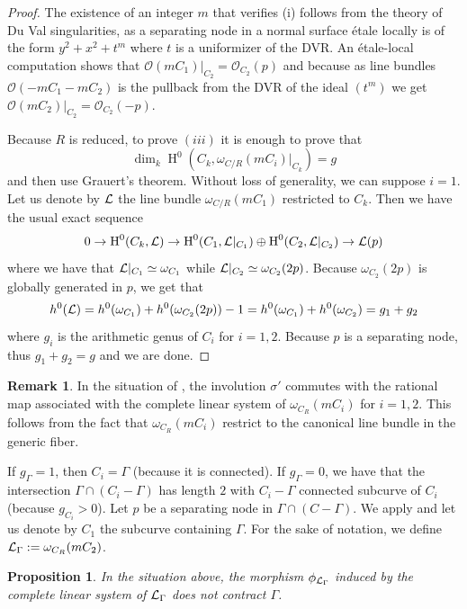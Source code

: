 \documentclass{alggeom}
\numberwithin{equation}{section}
\numberwithin{subsection}{section}
\newtheorem{proposition}[theorem]{Proposition}
\theoremstyle{definition}
\newtheorem{remark}[theorem]{Remark}
\theoremstyle{remark}
\newcommand\cO{\mathcal{O}} \newcommand\cP{\mathcal{P}}
\renewcommand\H{\operatorname{H}}
\begin{document}
\begin{proof}
	The existence of an integer $m$ that verifies (i) follows from the theory of Du Val singularities, as a separating node in a normal surface \'etale locally is of the form $y^2+x^2+t^m$ where $t$ is a uniformizer of the DVR. An \'etale-local computation shows that $\cO(mC_1)\vert_{C_2}=\cO_{C_2}(p)$ and because as line bundles $\cO(-mC_1-mC_2)$ is the pullback from the DVR of the ideal $(t^m)$ we get $\cO(mC_2)\vert_{C_2}=\cO_{C_2}(-p)$. 
	
	Because $R$ is reduced, to prove $(iii)$ it is enough to prove that $$\dim_k\H^0(C_k,\omega_{C/R}(mC_i)\vert_{C_k})=g$$
	and then use Grauert's theorem. 
	Without loss of generality, we can suppose $i=1$.
	Let us denote by $\mathcal{L}$ the line bundle $\omega_{C/R}(mC_1)$ restricted to $C_k$. Then we have the usual exact sequence
	$$0\rightarrow \H^0(C_k,\cL)\rightarrow \H^0(C_1,\cL\vert_{C_1})\oplus \H^0(C_2,\cL\vert_{C_2}) \rightarrow \cL(p)$$ 
	where we have that $\mathcal{L}\vert_{C_1}\simeq \omega_{C_1}$ while $\mathcal{L}\vert_{C_2}\simeq \omega_{C_2}(2p)$. Because $\omega_{C_2}(2p)$ is globally generated in $p$, we get that $$h^0(\mathcal{L})=h^0(\omega_{C_1})+h^0(\omega_{C_2}(2p))-1=h^0(\omega_{C_1})+h^0(\omega_{C_2})=g_1+g_2$$ where $g_i$ is the arithmetic genus of $C_i$ for $i=1,2$. Because $p$ is a separating node, thus $g_1+g_2=g$ and we are done.
	
\end{proof}

\begin{remark}
In the situation of , the involution $\sigma'$ commutes with the rational map associated with the complete linear system of $\omega_{C_R}(mC_i)$ for $i=1,2$. This follows from the fact that $\omega_{C_R}(mC_i)$ restrict to the canonical line bundle in the generic fiber. 
\end{remark}

  If $g_{\Gamma}=1$, then $C_i=\Gamma$ (because it is connected). If $g_{\Gamma}=0$, we have that the intersection $\Gamma \cap (C_i-\Gamma)$ has length $2$ with $C_i-\Gamma$ connected subcurve of $C_i$ (because $g_{C_i}>0$). Let $p$ be a separating node in $\Gamma \cap (C-\Gamma)$. We apply  and let us denote by $C_1$ the subcurve containing $\Gamma$. For the sake of notation, we define $\mathcal{L}_{\Gamma}:=\omega_{C_R}(mC_2)$. 

\begin{proposition}
	In the situation above, the morphism $\phi_{\mathcal{L}_{\Gamma}}$ induced by the complete linear system of $\mathcal{L}_{\Gamma}$ does not contract $\Gamma$. 
\end{proposition}
\end{document}
